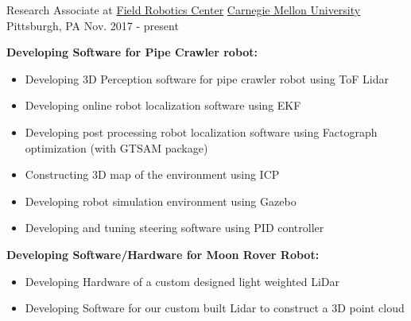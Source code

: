 \begin{cventries}
  \cventry
    {Research Associate at \href{https://www.frc.ri.cmu.edu/}{Field Robotics Center}} %
    {\href{https://www.ri.cmu.edu/}{Carnegie Mellon University}} %
    {Pittsburgh, PA} %
    {Nov. 2017 - present} %
    {
      \begin{cvitems} %
		\item \textbf{Developing Software for Pipe Crawler robot:}
		\begin{itemize}
			\item Developing 3D Perception software for pipe crawler robot using ToF Lidar
			\item Developing online robot localization software using EKF
			\item Developing post processing robot localization software using Factograph optimization (with GTSAM package)
			\item Constructing 3D map of the environment using ICP
			\item Developing robot simulation environment using Gazebo
			\item Developing and tuning steering software using PID controller
		\end{itemize}
		\item \textbf{Developing Software/Hardware for Moon Rover Robot:}
		\begin{itemize}
			\item Developing Hardware of a custom designed light weighted LiDar
			\item Developing Software for our custom built Lidar to construct a 3D point cloud
		\end{itemize}
      \end{cvitems}
    }







\end{cventries}
